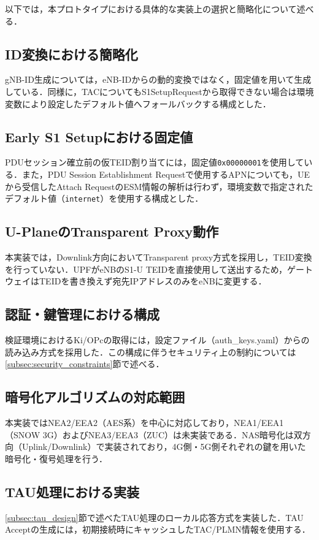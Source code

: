 以下では，本プロトタイプにおける具体的な実装上の選択と簡略化について述べる．

\subsection{ID変換における簡略化}
gNB-ID生成については，eNB-IDからの動的変換ではなく，固定値を用いて生成している．同様に，TACについてもS1SetupRequestから取得できない場合は環境変数により設定したデフォルト値へフォールバックする構成とした．

\subsection{Early S1 Setupにおける固定値}
PDUセッション確立前の仮TEID割り当てには，固定値\texttt{0x00000001}を使用している．また，PDU Session Establishment Requestで使用するAPNについても，UEから受信したAttach RequestのESM情報の解析は行わず，環境変数で指定されたデフォルト値（\texttt{internet}）を使用する構成とした．

\subsection{U-PlaneのTransparent Proxy動作}
本実装では，Downlink方向においてTransparent proxy方式を採用し，TEID変換を行っていない．UPFがeNBのS1-U TEIDを直接使用して送出するため，ゲートウェイはTEIDを書き換えず宛先IPアドレスのみをeNBに変更する．

\subsection{認証・鍵管理における構成}
検証環境におけるKi/OPcの取得には，設定ファイル（auth\_keys.yaml）からの読み込み方式を採用した．この構成に伴うセキュリティ上の制約については\ref{subsec:security_constraints}節で述べる．

\subsection{暗号化アルゴリズムの対応範囲}
本実装ではNEA2/EEA2（AES系）を中心に対応しており，NEA1/EEA1（SNOW 3G）およびNEA3/EEA3（ZUC）は未実装である．NAS暗号化は双方向（Uplink/Downlink）で実装されており，4G側・5G側それぞれの鍵を用いた暗号化・復号処理を行う．

\subsection{TAU処理における実装}
\ref{subsec:tau_design}節で述べたTAU処理のローカル応答方式を実装した．TAU Acceptの生成には，初期接続時にキャッシュしたTAC/PLMN情報を使用する．

